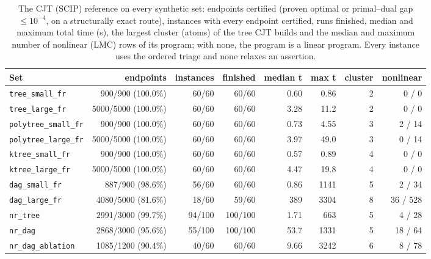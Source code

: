 \begin{table}[htbp]
\centering
\footnotesize
\caption{The CJT (SCIP) reference on every synthetic set: endpoints certified (proven optimal or primal--dual gap $\le 10^{-4}$, on a structurally exact route), instances with every endpoint certified, runs finished, median and maximum total time (s), the largest cluster (atoms) of the tree CJT builds and the median and maximum number of nonlinear (LMC) rows of its program; with none, the program is a linear program. Every instance uses the ordered triage and none relaxes an assertion.}
\label{tab:reference}
\begin{tabular}{lrrrrrrr}
\toprule
Set & endpoints & instances & finished & median t & max t & cluster & nonlinear \\
\midrule
\texttt{tree\_small\_fr} & 900/900 (100.0\%) & 60/60 & 60/60 & 0.60 & 0.86 & 2 & 0 / 0 \\
\texttt{tree\_large\_fr} & 5000/5000 (100.0\%) & 60/60 & 60/60 & 3.28 & 11.2 & 2 & 0 / 0 \\
\texttt{polytree\_small\_fr} & 900/900 (100.0\%) & 60/60 & 60/60 & 0.73 & 4.55 & 3 & 2 / 14 \\
\texttt{polytree\_large\_fr} & 5000/5000 (100.0\%) & 60/60 & 60/60 & 3.97 & 49.0 & 3 & 0 / 14 \\
\texttt{ktree\_small\_fr} & 900/900 (100.0\%) & 60/60 & 60/60 & 0.57 & 0.89 & 4 & 0 / 0 \\
\texttt{ktree\_large\_fr} & 5000/5000 (100.0\%) & 60/60 & 60/60 & 4.47 & 19.8 & 4 & 0 / 0 \\
\texttt{dag\_small\_fr} & 887/900 (98.6\%) & 56/60 & 60/60 & 0.86 & 1141 & 5 & 2 / 34 \\
\texttt{dag\_large\_fr} & 4080/5000 (81.6\%) & 18/60 & 59/60 & 389 & 3304 & 8 & 36 / 528 \\
\texttt{nr\_tree} & 2991/3000 (99.7\%) & 94/100 & 100/100 & 1.71 & 663 & 5 & 4 / 28 \\
\texttt{nr\_dag} & 2868/3000 (95.6\%) & 55/100 & 100/100 & 53.7 & 1331 & 5 & 18 / 64 \\
\texttt{nr\_dag\_ablation} & 1085/1200 (90.4\%) & 40/60 & 60/60 & 9.66 & 3242 & 6 & 8 / 78 \\
\bottomrule
\end{tabular}
\end{table}
